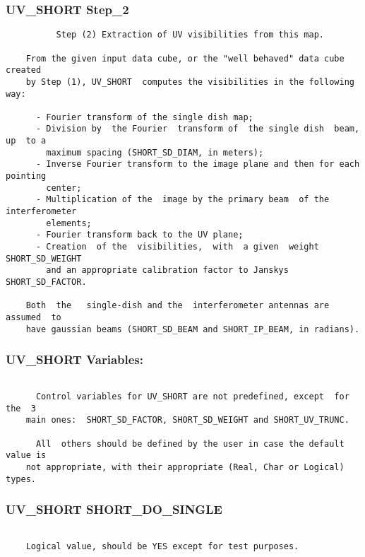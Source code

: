 \subsubsection{UV\_SHORT Step\_2}
\begin{verbatim}
          Step (2) Extraction of UV visibilities from this map.

    From the given input data cube, or the "well behaved" data cube  created
    by Step (1), UV_SHORT  computes the visibilities in the following way:

      - Fourier transform of the single dish map;
      - Division by  the Fourier  transform of  the single dish  beam, up  to a
        maximum spacing (SHORT_SD_DIAM, in meters);
      - Inverse Fourier transform to the image plane and then for each pointing
        center;
      - Multiplication of the  image by the primary beam  of the interferometer
        elements;
      - Fourier transform back to the UV plane;
      - Creation  of the  visibilities,  with  a given  weight  SHORT_SD_WEIGHT
        and an appropriate calibration factor to Janskys SHORT_SD_FACTOR.

    Both  the   single-dish and the  interferometer antennas are assumed  to
    have gaussian beams (SHORT_SD_BEAM and SHORT_IP_BEAM, in radians).

\end{verbatim}
\subsubsection{UV\_SHORT Variables:}
\begin{verbatim}

      Control variables for UV_SHORT are not predefined, except  for  the  3
    main ones:  SHORT_SD_FACTOR, SHORT_SD_WEIGHT and SHORT_UV_TRUNC.

      All  others should be defined by the user in case the default value is
    not appropriate, with their appropriate (Real, Char or Logical) types.

\end{verbatim}
\subsubsection{UV\_SHORT SHORT\_DO\_SINGLE}
\begin{verbatim}

    Logical value, should be YES except for test purposes.

\end{verbatim}
